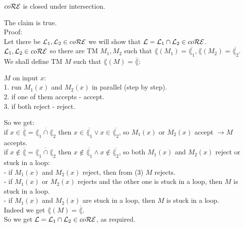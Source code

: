 $co\mathcal{R}\mathcal{E}$ is closed under intersection.

The claim is true. \\

Proof: \\
Let there be $\mathcal{L}_1, \mathcal{L}_2 \in co\mathcal{R}\mathcal{E}$ we will show that $\mathcal{L} = \mathcal{L}_1 \cap \mathcal{L}_2 \in co\mathcal{R}\mathcal{E}$. \\
$\mathcal{L}_1, \mathcal{L}_2 \in co\mathcal{R}\mathcal{E}$ so there are TM $M_1, M_2$ such that
$\lang(M_1) = \overline{\lang_1}, \lang(M_2) = \overline{\lang_2}$. \\
We shall define TM $M$ such that $\lang(M) = \overline{\lang}$:

$M \text{ on input } x$: \\
1. run $M_1(x)$ and $M_2(x)$ in parallel (step by step). \\
2. if one of them accepts - accept. \\
3. if both reject - reject.

So we get: \\
if $x \in \overline{\lang} = \overline{\lang_1 \cap \lang_2}$ then
$x \in \overline{\lang_1} \vee x \in \overline{\lang_2}$, so $M_1(x)$ or $M_2(x)$ accept $\rightarrow M$ accepts. \\
if $x \notin \overline{\lang} = \overline{\lang_1 \cap \lang_2}$  then
$x \notin \overline{\lang_1} \wedge x \notin \overline{\lang_2}$, so both $M_1(x)$ and $M_2(x)$ reject or stuck in a loop: \\
- if $M_1(x)$ and $M_2(x)$ reject, then from (3) $M$ rejects. \\
- if $M_1(x)$ or $M_2(x)$ rejects and the other one is stuck in a loop, then  $M$ is stuck in a loop. \\
- if $M_1(x)$ and $M_2(x)$ are stuck in a loop, then  $M$ is stuck in a loop. \\

Indeed we get $\lang(M) = \overline{\lang}$. \\
So we get $\mathcal{L} = \mathcal{L}_1 \cap \mathcal{L}_2 \in co\mathcal{R}\mathcal{E}$, as required. \\

